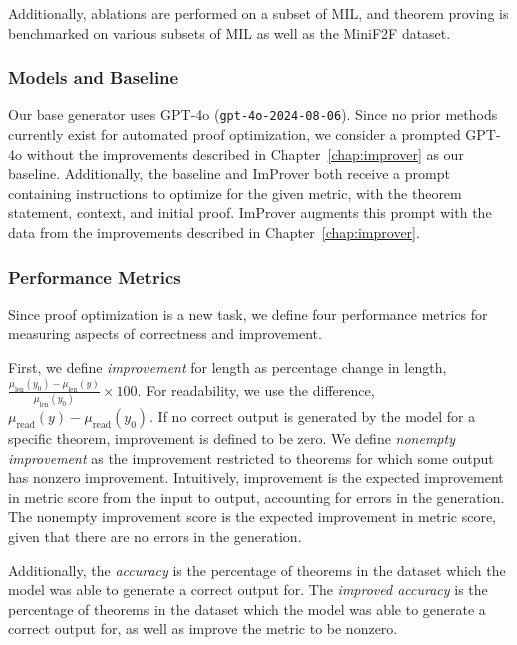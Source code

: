 Additionally, ablations are performed on a subset of MIL, and theorem proving is benchmarked on various subsets of MIL as well as the MiniF2F \cite{zheng2022miniff} dataset.

\subsubsection{Models and Baseline}

Our base generator uses GPT-4o \cite{openai2024gpt4technicalreport} (\texttt{gpt-4o-2024-08-06}). Since no prior methods currently exist for automated proof optimization, we consider a prompted GPT-4o without the improvements described in Chapter~\ref{chap:improver} as our baseline. Additionally, the baseline and ImProver both receive a prompt containing instructions to optimize for the given metric, with the theorem statement, context, and initial proof. ImProver augments this prompt with the data from the improvements described in Chapter~\ref{chap:improver}.

\subsubsection{Performance Metrics}

Since proof optimization is a new task, we define four performance metrics for measuring aspects of correctness and improvement.

First, we define \textit{improvement} for length as percentage change in length, $\frac{\mu_{\text{len}}(y_0)-\mu_{\text{len}}(y)}{\mu_{\text{len}}(y_0)}\times 100$. For readability, we use the difference, $\mu_{\text{read}}(y)-\mu_{\text{read}}(y_0)$. If no correct output is generated by the model for a specific theorem, improvement is defined to be zero. We define \textit{nonempty improvement} as the improvement restricted to theorems for which some output has nonzero improvement. Intuitively, improvement is the expected improvement in metric score from the input to output, accounting for errors in the generation. The nonempty improvement score is the expected improvement in metric score, given that there are no errors in the generation.

Additionally, the \textit{accuracy} is the percentage of theorems in the dataset which the model was able to generate a correct output for. The \textit{improved accuracy} is the percentage of theorems in the dataset which the model was able to generate a correct output for, as well as improve the metric to be nonzero.


